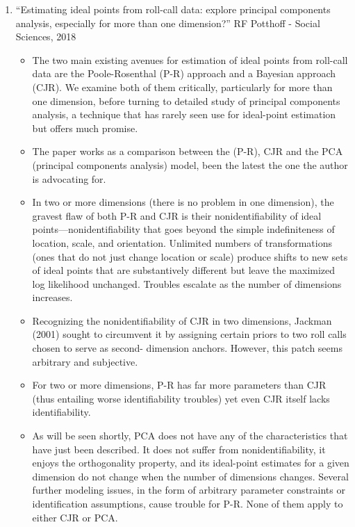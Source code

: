 \documentclass[a4paper,12pt]{article}
\begin{document}
\begin{enumerate}
\begin{itemize}
\end{itemize}


\newpage




\item “Estimating ideal points from roll-call data: explore principal components analysis, especially for more than one dimension?” RF Potthoff - Social Sciences, 2018 
\begin{itemize}
\item The two main existing avenues for estimation of ideal points from roll-call data are the Poole-Rosenthal (P-R) approach and a Bayesian approach (CJR). We examine both of them critically, particularly for more than one dimension, before turning to detailed study of principal components analysis, a technique that has rarely seen use for ideal-point estimation but offers much promise. 
\item The paper works as a comparison between the (P-R), CJR and the PCA (principal components analysis) model, been the latest the one the author is advocating for.  
\item In two or more dimensions (there is no problem in one dimension), the gravest flaw of both P-R and CJR is their nonidentifiability of ideal points—nonidentifiability that goes beyond the simple indefiniteness of location, scale, and orientation. Unlimited numbers of transformations (ones that do not just change location or scale) produce shifts to new sets of ideal points that are substantively different but leave the maximized log likelihood unchanged. Troubles escalate as the number of dimensions increases. 
\item Recognizing the nonidentifiability of CJR in two dimensions, Jackman (2001) sought to circumvent it by assigning certain priors to two roll calls chosen to serve as second- dimension anchors. However, this patch seems arbitrary and subjective. 
\item For two or more dimensions, P-R has far more parameters than CJR (thus entailing worse identifiability troubles) yet even CJR itself lacks identifiability. 
\item As will be seen shortly, PCA does not have any of the characteristics that have just been described. It does not suffer from nonidentifiability, it enjoys the orthogonality property, and its ideal-point estimates for a given dimension do not change when the number of dimensions changes. Several further modeling issues, in the form of arbitrary parameter constraints or identification assumptions, cause trouble for P-R. None of them apply to either CJR or PCA. 

\end{itemize}
\end{enumerate}
\end{document}
